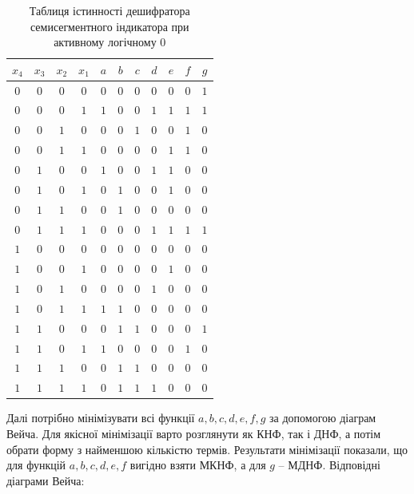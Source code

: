\documentclass[12pt,a4paper]{article}
\begin{document}
    \begin{table}[h]
        \centering
        \renewcommand{\arraystretch}{1.15}
        \begin{tabular}{|cccc|ccccccc|}
        \hline
        $x_4$ & $x_3$ & $x_2$ & $x_1$ & $a$ & $b$ & $c$ & $d$ & $e$ & $f$ & $g$ \\
        \hline
        $0$ & $0$ & $0$ & $0$ & $0$ & $0$ & $0$ & $0$ & $0$ & $0$ & $1$ \\
        $0$ & $0$ & $0$ & $1$ & $1$ & $0$ & $0$ & $1$ & $1$ & $1$ & $1$ \\
        $0$ & $0$ & $1$ & $0$ & $0$ & $0$ & $1$ & $0$ & $0$ & $1$ & $0$ \\
        $0$ & $0$ & $1$ & $1$ & $0$ & $0$ & $0$ & $0$ & $1$ & $1$ & $0$ \\
        $0$ & $1$ & $0$ & $0$ & $1$ & $0$ & $0$ & $1$ & $1$ & $0$ & $0$ \\
        $0$ & $1$ & $0$ & $1$ & $0$ & $1$ & $0$ & $0$ & $1$ & $0$ & $0$ \\
        $0$ & $1$ & $1$ & $0$ & $0$ & $1$ & $0$ & $0$ & $0$ & $0$ & $0$ \\
        $0$ & $1$ & $1$ & $1$ & $0$ & $0$ & $0$ & $1$ & $1$ & $1$ & $1$ \\
        $1$ & $0$ & $0$ & $0$ & $0$ & $0$ & $0$ & $0$ & $0$ & $0$ & $0$ \\
        $1$ & $0$ & $0$ & $1$ & $0$ & $0$ & $0$ & $0$ & $1$ & $0$ & $0$ \\
        $1$ & $0$ & $1$ & $0$ & $0$ & $0$ & $0$ & $1$ & $0$ & $0$ & $0$ \\
        $1$ & $0$ & $1$ & $1$ & $1$ & $1$ & $0$ & $0$ & $0$ & $0$ & $0$ \\
        $1$ & $1$ & $0$ & $0$ & $0$ & $1$ & $1$ & $0$ & $0$ & $0$ & $1$ \\
        $1$ & $1$ & $0$ & $1$ & $1$ & $0$ & $0$ & $0$ & $0$ & $1$ & $0$ \\
        $1$ & $1$ & $1$ & $0$ & $0$ & $1$ & $1$ & $0$ & $0$ & $0$ & $0$ \\
        $1$ & $1$ & $1$ & $1$ & $0$ & $1$ & $1$ & $1$ & $0$ & $0$ & $0$ \\
        \hline
        \end{tabular}
        \caption{\centering Таблиця істинності дешифратора семисегментного індикатора при активному логічному 0}
    \end{table}

    Далі потрібно мінімізувати всі функції $a, b, c, d, e, f, g$ за допомогою діаграм Вейча. Для якісної мінімізації варто розглянути як КНФ, так і ДНФ, а потім обрати форму з найменшою кількістю термів. Результати мінімізації показали, що для функцій $a, b, c, d, e, f$ вигідно взяти МКНФ, а для $g$ -- МДНФ. Відповідні діаграми Вейча:
\end{document}
